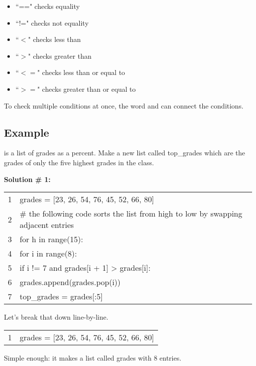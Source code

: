 \documentclass{article}
\newcommand{\icode}[1]{{\ttfamily #1}}
\newenvironment{code}{\begin{tcolorbox}\ttfamily}{\end{tcolorbox}}
\begin{document}
\begin{multicols}{2}
	\begin{itemize}
		\item ``==" checks equality
		\item ``!=" checks not equality
		\item ``$<$" checks less than
		\item ``$>$" checks greater than
		\item ``$<=$" checks less than or equal to
		\item ``$>=$" checks greater than or equal to
	\end{itemize}
\end{multicols}
\noindent To check multiple conditions at once, the word \icode{and} can connect the conditions.
\subsection{Example}
\noindent \icode{grades} is a list of grades as a percent. Make a new list called \icode{top\_grades} which are the grades of only the five highest grades in the class.
\vspace{1 mm}

\noindent\textbf{Solution \# 1:}
\begin{code}
	\begin{tabular}{l|l}
		1&grades = [23, 26, 54, 76, 45, 52, 66, 80]\\
		2&\# the following code sorts the list from high to low by swapping adjacent entries\\
		3&for h in range(15): \\
		4&\hspace{2 em}for i in range(8): \\
		5&\hspace{4 em}if i != 7 and grades[i + 1] > grades[i]:\\
		6& \hspace{6 em}grades.append(grades.pop(i))\\
		7& top\_grades = grades[:5]
	\end{tabular}
\end{code}
\noindent Let's break that down line-by-line.
\vspace{.5 cm}

\begin{code}
	\begin{tabular}{l|l}
		1&grades = [23, 26, 54, 76, 45, 52, 66, 80]
	\end{tabular}
\end{code}
Simple enough: it makes a list called \icode{grades} with 8 entries.
\end{document}
